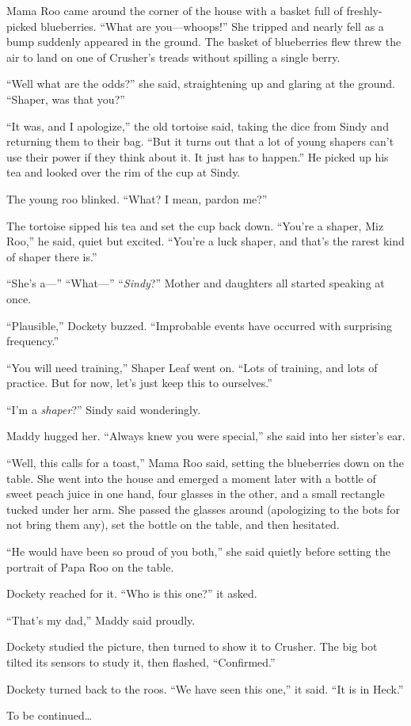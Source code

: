 \documentclass[10pt]{article}
\begin{document}
Mama Roo came around the corner of the house with a basket full of
freshly-picked blueberries. ``What are you---whoops!'' She tripped and
nearly fell as a bump suddenly appeared in the ground. The basket of
blueberries flew threw the air to land on one of Crusher's treads
without spilling a single berry.

``Well what are the odds?'' she said, straightening up and glaring at
the ground. ``Shaper, was that you?''

``It was, and I apologize,'' the old tortoise said, taking the dice from
Sindy and returning them to their bag. ``But it turns out that a lot of
young shapers can't use their power if they think about it. It just has
to happen.'' He picked up his tea and looked over the rim of the cup at
Sindy.

The young roo blinked. ``What? I mean, pardon me?''

The tortoise sipped his tea and set the cup back down. ``You're a
shaper, Miz Roo,'' he said, quiet but excited. ``You're a luck shaper,
and that's the rarest kind of shaper there is.''

``She's a---'' ``What---'' ``\emph{Sindy}?'' Mother and daughters all
started speaking at once.

``Plausible,'' Dockety buzzed. ``Improbable events have occurred with
surprising frequency.''

``You will need training,'' Shaper Leaf went on. ``Lots of training, and
lots of practice. But for now, let's just keep this to ourselves.''

``I'm a \emph{shaper}?'' Sindy said wonderingly.

Maddy hugged her. ``Always knew you were special,'' she said into her
sister's ear.

``Well, this calls for a toast,'' Mama Roo said, setting the blueberries
down on the table. She went into the house and emerged a moment later
with a bottle of sweet peach juice in one hand, four glasses in the
other, and a small rectangle tucked under her arm. She passed the
glasses around (apologizing to the bots for not bring them any), set the
bottle on the table, and then hesitated.

``He would have been so proud of you both,'' she said quietly before
setting the portrait of Papa Roo on the table.

Dockety reached for it. ``Who is this one?'' it asked.

``That's my dad,'' Maddy said proudly.

Dockety studied the picture, then turned to show it to Crusher. The big
bot tilted its sensors to study it, then flashed, ``Confirmed.''

Dockety turned back to the roos. ``We have seen this one,'' it said.
``It is in Heck.''

To be continued\ldots{}
\end{document}
